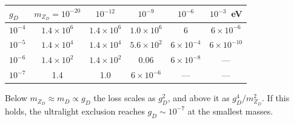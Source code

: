 \documentclass[11pt,a4paper]{article}
\newcommand{\mzd}{m_{Z_D}}
\newcommand{\gd}{g_D}
\begin{document}
\begin{center}
\begin{tabular}{lccccc}
  $\gd$ & $\mzd = 10^{-20}$ & $10^{-12}$ & $10^{-9}$ & $10^{-6}$ & $10^{-3}$~eV \\ \hline
  $10^{-4}$ & $1.4\times10^{6}$ & $1.4\times10^{6}$ & $1.0\times10^{6}$ & 6 & $6\times10^{-6}$ \\
  $10^{-5}$ & $1.4\times10^{4}$ & $1.4\times10^{4}$ & $5.6\times10^{2}$ & $6\times10^{-4}$ & $6\times10^{-10}$ \\
  $10^{-6}$ & $1.4\times10^{2}$ & $1.4\times10^{2}$ & $0.06$ & $6\times10^{-8}$ & --- \\
  $10^{-7}$ & 1.4 & 1.0 & $6\times10^{-6}$ & --- & --- \\
\end{tabular}
\end{center}
Below $\mzd \approx m_D \propto \gd$ the loss scales as $\gd^2$, and above it as $\gd^4/\mzd^2$. If this holds,
the ultralight exclusion reaches $\gd \sim 10^{-7}$ at the smallest masses.
\end{document}

